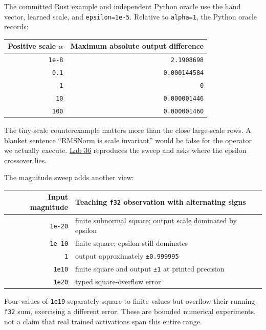 The committed Rust example and independent Python oracle use the hand
vector, learned scale, and \texttt{epsilon=1e-5}. Relative to
\texttt{alpha=1}, the Python oracle records:


{\def\LTcaptype{none} %
\begin{longtable}[]{@{}rr@{}}
\toprule\noalign{}
Positive scale \(\alpha\) & Maximum absolute output difference \\
\midrule\noalign{}
\endhead
\bottomrule\noalign{}
\endlastfoot
\texttt{1e-8} & \texttt{2.1908698} \\
\texttt{0.1} & \texttt{0.000144584} \\
\texttt{1} & \texttt{0} \\
\texttt{10} & \texttt{0.000001446} \\
\texttt{100} & \texttt{0.000001460} \\
\end{longtable}
}

The tiny-scale counterexample matters more than the close large-scale
rows. A blanket sentence ``RMSNorm is scale invariant'' would be false
for the operator we actually execute.
\href{https://github.com/hermonai/inside-the-llm-engine/blob/astra-visual-rewrite/labs/lab-36-rmsnorm-scale-experiment.md}{Lab
36} reproduces the sweep and asks where the epsilon crossover lies.

The magnitude sweep adds another view:


{\def\LTcaptype{none} %
\begin{longtable}[]{@{}rl@{}}
\toprule\noalign{}
Input magnitude & Teaching \texttt{f32} observation with alternating
signs \\
\midrule\noalign{}
\endhead
\bottomrule\noalign{}
\endlastfoot
\texttt{1e-20} & finite subnormal square; output scale dominated by
epsilon \\
\texttt{1e-10} & finite square; epsilon still dominates \\
\texttt{1} & output approximately \texttt{±0.999995} \\
\texttt{1e10} & finite square and output \texttt{±1} at printed
precision \\
\texttt{1e20} & typed square-overflow error \\
\end{longtable}
}

Four values of \texttt{1e19} separately square to finite values but
overflow their running \texttt{f32} sum, exercising a different error.
These are bounded numerical experiments, not a claim that real trained
activations span this entire range.

